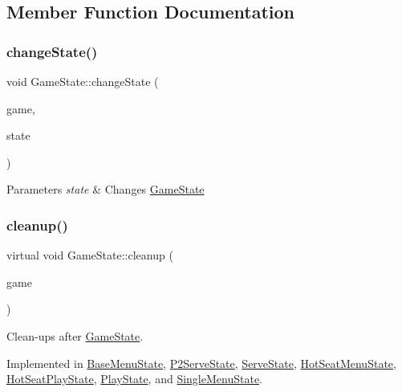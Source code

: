 \subsection{Member Function Documentation}
\mbox{\label{class_game_state_a5f4ffcaa495af37ba423627e3f961fdb}} 
\subsubsection{\texorpdfstring{changeState()}{changeState()}}
{\footnotesize\ttfamily void Game\+State\+::change\+State (\begin{DoxyParamCaption}\item[{\mbox{\hyperlink{class_game_engine}{Game\+Engine}} $\ast$}]{game,  }\item[{\mbox{\hyperlink{class_game_state}{Game\+State}} $\ast$}]{state }\end{DoxyParamCaption})\hspace{0.3cm}{\ttfamily [inline]}}


\begin{DoxyParams}{Parameters}
{\em state} & Changes \mbox{\hyperlink{class_game_state}{Game\+State}} \\
\hline
\end{DoxyParams}
\mbox{\label{class_game_state_a7df4ea0b4815d2b3b35dbec2a399a0b6}} 
\subsubsection{\texorpdfstring{cleanup()}{cleanup()}}
{\footnotesize\ttfamily virtual void Game\+State\+::cleanup (\begin{DoxyParamCaption}\item[{\mbox{\hyperlink{class_game_engine}{Game\+Engine}} $\ast$}]{game }\end{DoxyParamCaption})\hspace{0.3cm}{\ttfamily [pure virtual]}}



Clean-\/ups after \mbox{\hyperlink{class_game_state}{Game\+State}}. 



Implemented in \mbox{\hyperlink{class_base_menu_state_a6ca2a29b45a0c2d6d2cbbb6ee67d38ac}{Base\+Menu\+State}}, \mbox{\hyperlink{class_p2_serve_state_ab5cbfaef01142275fcb6aa2947c9e1b6}{P2\+Serve\+State}}, \mbox{\hyperlink{class_serve_state_a3516119feb2bf386b3686867da412328}{Serve\+State}}, \mbox{\hyperlink{class_hot_seat_menu_state_ada87b1a00943777a31b8b24ddf347350}{Hot\+Seat\+Menu\+State}}, \mbox{\hyperlink{class_hot_seat_play_state_ae9ca450fc070526a0ee329002e4308f2}{Hot\+Seat\+Play\+State}}, \mbox{\hyperlink{class_play_state_a047657388db62dc5a80b12147b0294b2}{Play\+State}}, and \mbox{\hyperlink{class_single_menu_state_a61fdbb1a47f269d9f99f99ef9312624f}{Single\+Menu\+State}}.

